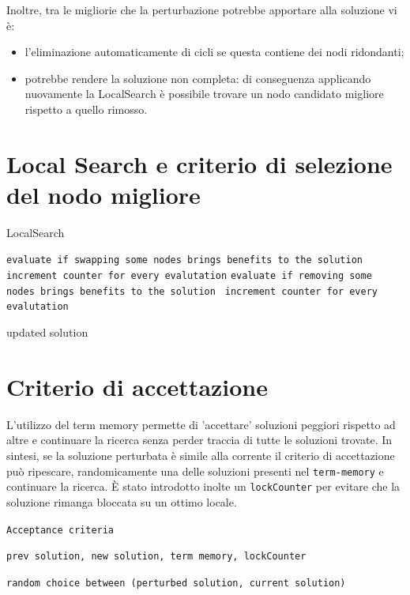 \documentclass[11pt]{article}
\begin{document}
Inoltre, tra le migliorie che la perturbazione potrebbe apportare alla soluzione vi è:
\begin{itemize}
\item{l'eliminazione automaticamente di cicli se questa contiene dei nodi ridondanti;}
\item{potrebbe rendere la soluzione non completa: di conseguenza applicando nuovamente la LocalSearch è possibile trovare un nodo candidato migliore rispetto a quello rimosso.}
\end{itemize}

\pagebreak

\section{Local Search e criterio di selezione del nodo migliore}

\begin{algorithm}
\caption{LocalSearch}
\begin{algorithmic}

    \State\texttt{evaluate if swapping some nodes brings benefits to the solution }
    \State\texttt{increment counter for every evalutation}
\Else{}
\State\texttt{evaluate if removing some nodes brings benefits to the solution }
    \State\texttt{increment counter for every evalutation}
\EndIf{}


\State \Return updated solution
\end{algorithmic}
\end{algorithm}

\pagebreak

\section{Criterio di accettazione}

L'utilizzo del term memory permette di 'accettare' soluzioni peggiori rispetto ad altre e continuare la ricerca senza perder traccia di tutte le soluzioni trovate.
In sintesi, se la soluzione perturbata è simile alla corrente il criterio di accettazione può ripescare, randomicamente una delle soluzioni presenti nel \verb|term-memory| e continuare la ricerca.
È stato introdotto inolte un \verb|lockCounter| per evitare che la soluzione rimanga bloccata su un ottimo locale.


\begin{algorithm}
\caption{\texttt{Acceptance criteria}}
\begin{algorithmic}
    \Require \texttt{prev solution, new solution, term memory, lockCounter}

    \EndIf{}
    
    \State \Return \texttt{random choice between (perturbed solution, current solution)}
\end{algorithmic}
\end{algorithm}
\end{document}
